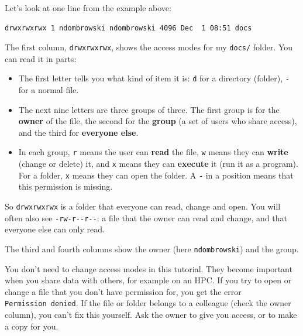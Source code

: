 \documentclass[
  letterpaper,
  DIV=11,
  numbers=noendperiod]{scrreprt}
\providecommand{\tightlist}{%
  \setlength{\itemsep}{0pt}\setlength{\parskip}{0pt}}
\begin{document}
\begin{tcolorbox}[enhanced jigsaw, coltitle=black, breakable, titlerule=0mm, colback=white, rightrule=.15mm, bottomrule=.15mm, toprule=.15mm, colframe=quarto-callout-tip-color-frame, colbacktitle=quarto-callout-tip-color!10!white, bottomtitle=1mm, opacitybacktitle=0.6, toptitle=1mm, leftrule=.75mm, arc=.35mm, title=\textcolor{quarto-callout-tip-color}{\faLightbulb}\hspace{0.5em}{Tip: Reading the access modes (optional)}, left=2mm, opacityback=0]

Let's look at one line from the example above:

\begin{verbatim}
drwxrwxrwx 1 ndombrowski ndombrowski 4096 Dec  1 08:51 docs
\end{verbatim}

The first column, \texttt{drwxrwxrwx}, shows the access modes for my
\texttt{docs/} folder. You can read it in parts:

\begin{itemize}
\tightlist
\item
  The first letter tells you what kind of item it is: \texttt{d} for a
  directory (folder), \texttt{-} for a normal file.
\item
  The next nine letters are three groups of three. The first group is
  for the \textbf{owner} of the file, the second for the \textbf{group}
  (a set of users who share access), and the third for \textbf{everyone
  else}.
\item
  In each group, \texttt{r} means the user can \textbf{read} the file,
  \texttt{w} means they can \textbf{write} (change or delete) it, and
  \texttt{x} means they can \textbf{execute} it (run it as a program).
  For a folder, \texttt{x} means they can open the folder. A \texttt{-}
  in a position means that this permission is missing.
\end{itemize}

So \texttt{drwxrwxrwx} is a folder that everyone can read, change and
open. You will often also see \texttt{-rw-r-\/-r-\/-}: a file that the
owner can read and change, and that everyone else can only read.

The third and fourth columns show the owner (here \texttt{ndombrowski})
and the group.

You don't need to change access modes in this tutorial. They become
important when you share data with others, for example on an HPC. If you
try to open or change a file that you don't have permission for, you get
the error \texttt{Permission\ denied}. If the file or folder belongs to
a colleague (check the owner column), you can't fix this yourself. Ask
the owner to give you access, or to make a copy for you.

\end{tcolorbox}
\end{document}
